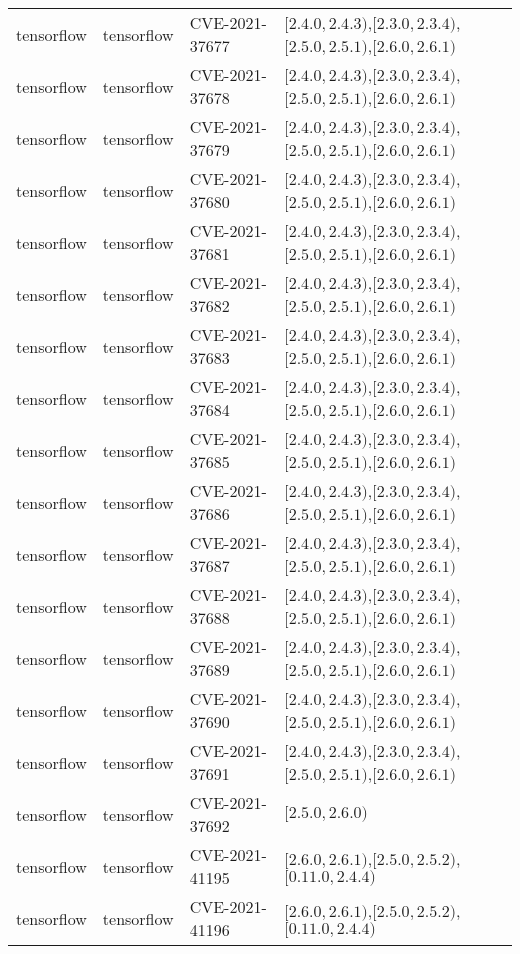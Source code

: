 \begin{tabular}{llll}
tensorflow & tensorflow & CVE-2021-37677 & $[2.4.0,2.4.3)$,$[2.3.0,2.3.4)$,$[2.5.0,2.5.1)$,$[2.6.0,2.6.1)$ \\
tensorflow & tensorflow & CVE-2021-37678 & $[2.4.0,2.4.3)$,$[2.3.0,2.3.4)$,$[2.5.0,2.5.1)$,$[2.6.0,2.6.1)$ \\
tensorflow & tensorflow & CVE-2021-37679 & $[2.4.0,2.4.3)$,$[2.3.0,2.3.4)$,$[2.5.0,2.5.1)$,$[2.6.0,2.6.1)$ \\
tensorflow & tensorflow & CVE-2021-37680 & $[2.4.0,2.4.3)$,$[2.3.0,2.3.4)$,$[2.5.0,2.5.1)$,$[2.6.0,2.6.1)$ \\
tensorflow & tensorflow & CVE-2021-37681 & $[2.4.0,2.4.3)$,$[2.3.0,2.3.4)$,$[2.5.0,2.5.1)$,$[2.6.0,2.6.1)$ \\
tensorflow & tensorflow & CVE-2021-37682 & $[2.4.0,2.4.3)$,$[2.3.0,2.3.4)$,$[2.5.0,2.5.1)$,$[2.6.0,2.6.1)$ \\
tensorflow & tensorflow & CVE-2021-37683 & $[2.4.0,2.4.3)$,$[2.3.0,2.3.4)$,$[2.5.0,2.5.1)$,$[2.6.0,2.6.1)$ \\
tensorflow & tensorflow & CVE-2021-37684 & $[2.4.0,2.4.3)$,$[2.3.0,2.3.4)$,$[2.5.0,2.5.1)$,$[2.6.0,2.6.1)$ \\
tensorflow & tensorflow & CVE-2021-37685 & $[2.4.0,2.4.3)$,$[2.3.0,2.3.4)$,$[2.5.0,2.5.1)$,$[2.6.0,2.6.1)$ \\
tensorflow & tensorflow & CVE-2021-37686 & $[2.4.0,2.4.3)$,$[2.3.0,2.3.4)$,$[2.5.0,2.5.1)$,$[2.6.0,2.6.1)$ \\
tensorflow & tensorflow & CVE-2021-37687 & $[2.4.0,2.4.3)$,$[2.3.0,2.3.4)$,$[2.5.0,2.5.1)$,$[2.6.0,2.6.1)$ \\
tensorflow & tensorflow & CVE-2021-37688 & $[2.4.0,2.4.3)$,$[2.3.0,2.3.4)$,$[2.5.0,2.5.1)$,$[2.6.0,2.6.1)$ \\
tensorflow & tensorflow & CVE-2021-37689 & $[2.4.0,2.4.3)$,$[2.3.0,2.3.4)$,$[2.5.0,2.5.1)$,$[2.6.0,2.6.1)$ \\
tensorflow & tensorflow & CVE-2021-37690 & $[2.4.0,2.4.3)$,$[2.3.0,2.3.4)$,$[2.5.0,2.5.1)$,$[2.6.0,2.6.1)$ \\
tensorflow & tensorflow & CVE-2021-37691 & $[2.4.0,2.4.3)$,$[2.3.0,2.3.4)$,$[2.5.0,2.5.1)$,$[2.6.0,2.6.1)$ \\
tensorflow & tensorflow & CVE-2021-37692 & $[2.5.0,2.6.0)$ \\
tensorflow & tensorflow & CVE-2021-41195 & $[2.6.0,2.6.1)$,$[2.5.0,2.5.2)$,$[0.11.0,2.4.4)$ \\
tensorflow & tensorflow & CVE-2021-41196 & $[2.6.0,2.6.1)$,$[2.5.0,2.5.2)$,$[0.11.0,2.4.4)$ \\

\end{tabular}
